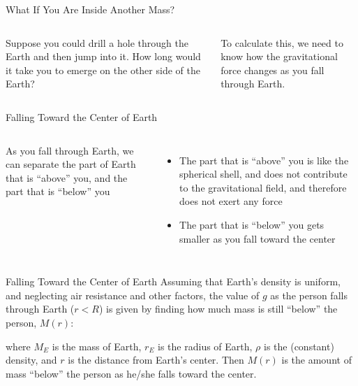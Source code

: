 \documentclass[12pt,compress,aspectratio=169]{beamer}
\begin{document}
\begin{frame}{What If You Are Inside Another Mass?}%
  \begin{columns}


    Suppose you could drill a hole through the Earth and then jump into it. How
    long would it take you to emerge on the other side of the Earth?

    \vspace{.2in}To calculate this, we need to know how the gravitational force
    changes as you fall through Earth.
  \end{columns}
\end{frame}




\begin{frame}{Falling Toward the Center of Earth}
  \begin{columns}

    As you fall through Earth, we can separate the part of Earth that is
    ``above'' you, and the part that is ``below'' you
    \begin{itemize}
    \item The part that is ``above'' you is like the spherical shell, and does
      not contribute to the gravitational field, and therefore does not exert
      any force
    \item The part that is ``below'' you gets smaller as you fall toward the
      center
    \end{itemize}
  \end{columns}
\end{frame}



\begin{frame}{Falling Toward the Center of Earth}
  Assuming that Earth's density is uniform, and neglecting air resistance and
  other factors, the value of $g$ as the person falls through Earth ($r<R$) is
  given by finding how much mass is still ``below'' the person, $M(r)$:


  where $M_E$ is the mass of Earth, $r_E$ is the radius of Earth, $\rho$ is the
  (constant) density, and $r$ is the distance from Earth's center. Then $M(r)$
  is the amount of mass ``below'' the person as he/she falls toward the center.
\end{frame}
\end{document}
